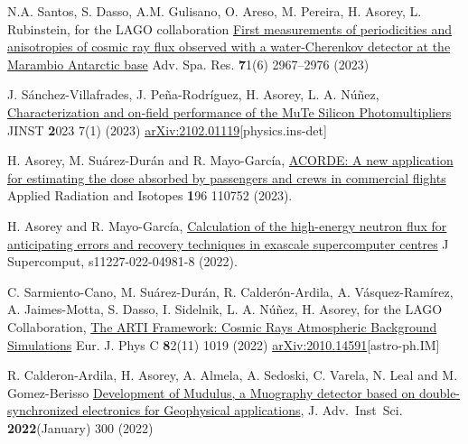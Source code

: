 \noindent
\begin{etaremune}

\item {} N.A. Santos, S. Dasso, A.M. Gulisano, O. Areso, M. Pereira, H. Asorey, L. Rubinstein, for the LAGO collaboration \href{https://doi.org/10.1016/j.asr.2022.11.041}{First measurements of periodicities and anisotropies of cosmic ray flux observed with a water-Cherenkov detector at the Marambio Antarctic base} Adv. Spa. Res. {\textbf 71}(6) 2967--2976 (2023)

\item {} J. Sánchez-Villafrades, J. Peña-Rodríguez, H. Asorey, L. A. Núñez, \href{https://doi.org/10.3390/instruments7010007}{Characterization and on-field performance of the MuTe Silicon Photomultipliers} JINST {\textbf 2023} 7(1) (2023) \href{https://arxiv.org/abs/2102.01119}{arXiv:2102.01119}[physics.ins-det]

\item {} H. Asorey, M. Suárez-Durán and R. Mayo-García, \href{https://doi.org/10.1016/j.apradiso.2023.110752}{ACORDE: A new application for estimating the dose absorbed by passengers and crews in commercial flights} Applied Radiation and Isotopes {\textbf 196} 110752 (2023).

\item {} H. Asorey and R. Mayo-García, \href{https://doi.org/10.1007/s11227-022-04981-8}{Calculation of the high-energy neutron flux for anticipating errors and recovery techniques in exascale supercomputer centres} J Supercomput, s11227-022-04981-8 (2022).

\item {} C. Sarmiento-Cano, M. Suárez-Durán, R. Calderón-Ardila, A. Vásquez-Ramírez, A. Jaimes-Motta, S. Dasso, I. Sidelnik, L. A. Núñez, H. Asorey, for the LAGO Collaboration, \href{https://doi.org/10.1140/epjc/s10052-022-10883-z}{The ARTI Framework: Cosmic Rays Atmospheric Background Simulations} Eur. J. Phys C {\textbf 82}(11) 1019 (2022) \href{https://arxiv.org/abs/2010.14591}{arXiv:2010.14591}[astro-ph.IM]

\item {} R. Calderon-Ardila, H. Asorey, A. Almela, A. Sedoski, C. Varela, N. Leal and M. Gomez-Berisso \href{http://doi.org/10.31526/jais.2022.300}{Development of Mudulus, a Muography detector based on double-synchronized electronics for Geophysical applications}, J. Adv.\ Inst\  Sci. {\textbf{2022}}(January) 300 (2022)


\end{etaremune}
